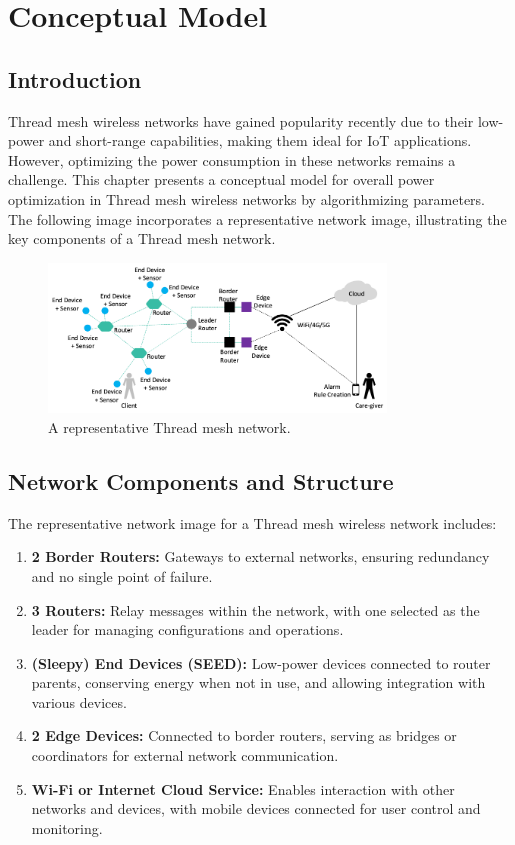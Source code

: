 \chapter{Conceptual Model}\label{chap:conceptual_model}


\section{Introduction}\label{sec:introduction}
Thread mesh wireless networks have gained popularity recently due to their low-power and short-range capabilities, making them ideal for IoT applications. However, optimizing the power consumption in these networks remains a challenge. This chapter presents a conceptual model for overall power optimization in Thread mesh wireless networks by algorithmizing parameters. The following image incorporates a representative network image, illustrating the key components of a Thread mesh network.

\begin{figure}[h]
    \centering
    \includegraphics[width=0.8\textwidth]{images/conceptual_model/Thread_mesh_network.png}
    \caption{A representative Thread mesh network.}
    \label{fig:conceptual_model}
\end{figure}


\section{Network Components and Structure}\label{sec:network_components}
The representative network image for a Thread mesh wireless network includes:

\vspace{2mm}
\begin{enumerate}
  \item \textbf{2 Border Routers:} Gateways to external networks, ensuring redundancy and no single point of failure.
  \item \textbf{3 Routers:} Relay messages within the network, with one selected as the leader for managing configurations and operations.
  \item \textbf{(Sleepy) End Devices (SEED):} Low-power devices connected to router parents, conserving energy when not in use, and allowing integration with various devices.
  \item \textbf{2 Edge Devices:} Connected to border routers, serving as bridges or coordinators for external network communication.
  \item \textbf{Wi-Fi or Internet Cloud Service:} Enables interaction with other networks and devices, with mobile devices connected for user control and monitoring.
\end{enumerate}
\vspace{3mm}


